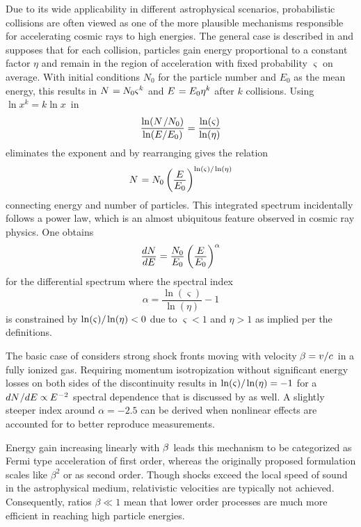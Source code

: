 Due to its wide applicability in different astrophysical scenarios, probabilistic collisions are often viewed as one of
the more plausible mechanisms responsible for accelerating cosmic rays to high energies. The general case is described in
\cite{Longair_2011} and supposes that for each collision, particles gain energy proportional to a constant factor $\eta$ and
remain in the region of acceleration with fixed probability $\varsigma$ on average. With initial conditions $N_0$ for the
particle number and $E_0$ as the mean energy, this results in $N \kern+0.9pt = N_0 \varsigma^k$ and $E \kern+0.9pt = E_0 \eta^k$
after $k$ collisions. Using $\ln x^k = k\ln x$~in
\begin{equation*}
	\frac{\ln (N \kern+1.0pt / N_0)}{\ln (E / E_0)} = \frac{\ln(\varsigma)}{\ln(\eta)}
\end{equation*}
eliminates the exponent and by rearranging gives the relation
\begin{equation*}
	N \kern+0.9pt = N_0 \left( \frac{\raisebox{-0.3ex}{$E$}}{\raisebox{0.3ex}{$E_0$}} \right)^{\ln(\varsigma) / \kern-0.5pt \ln(\eta)}
\end{equation*}
connecting energy and number of particles. This integrated spectrum incidentally follows a power law, which is an almost
ubiquitous feature observed in cosmic ray physics. One obtains
\begin{equation*}
	\frac{\raisebox{-0.3ex}{$dN$}}{\raisebox{0.3ex}{$dE$}} = \frac{\raisebox{-0.3ex}{$N_0$}}{\raisebox{0.3ex}{$E_0$}}
	\left( \frac{\raisebox{-0.3ex}{$E$}}{\raisebox{0.3ex}{$E_0$}} \right)^\alpha
\end{equation*}
for the differential spectrum where the spectral index
\begin{equation*}
	\alpha = \frac{\ln(\varsigma)}{\ln(\eta)} - 1
\end{equation*}
is constrained by $\ln(\varsigma) / \kern-0.5pt \ln(\eta) < 0$ due to $\varsigma < 1$ and $\eta > 1$ as implied per the definitions.

The basic case of  considers strong shock fronts moving with velocity $\kern-0.5pt \beta = v / c \kern+1.0pt$ in a
fully ionized gas. Requiring momentum isotropization without significant energy losses on both sides of the discontinuity results
in $\ln(\varsigma) / \kern-0.5pt \ln(\eta) = -1$ for a $dN \kern+0.5pt / dE \propto \kern-0.5pt E^{\kern+0.5pt -2}$ spectral dependence
that is discussed by \cite{Longair_2011} as well. A slightly steeper index around $\alpha = \num{-2.5}$ can be derived when nonlinear
effects are accounted for to better reproduce measurements.

Energy gain increasing linearly with $\kern-0.5pt \beta \kern+1.0pt$ leads this mechanism to be categorized as Fermi type acceleration
of first order, whereas the originally proposed formulation scales like $\beta^2$ or as second order. Though shocks exceed the local
speed of sound in the astrophysical medium, relativistic velocities are typically not achieved. Consequently, ratios $\beta \ll 1$ mean
that lower order processes are much more efficient in reaching high particle energies.
